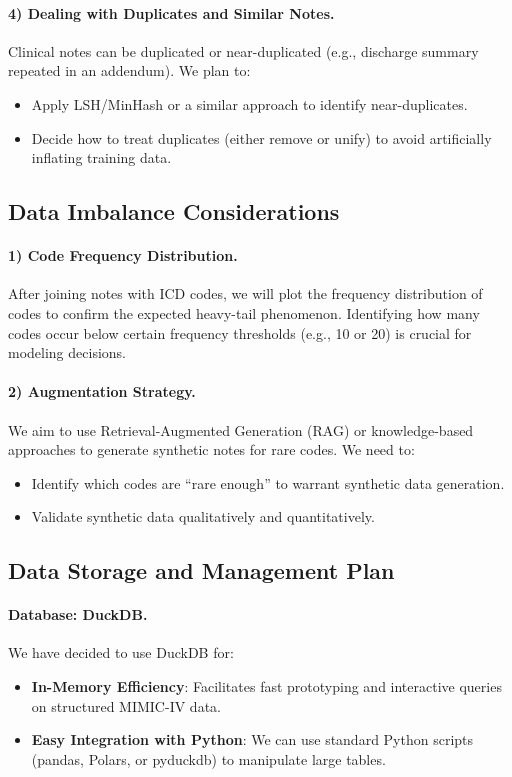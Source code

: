 \documentclass[12pt,a4paper]{report}
\begin{document}
\paragraph{4) Dealing with Duplicates and Similar Notes.}
Clinical notes can be duplicated or near-duplicated (e.g., discharge summary repeated in an addendum). We plan to:
\begin{itemize}
    \item Apply LSH/MinHash or a similar approach to identify near-duplicates.
    \item Decide how to treat duplicates (either remove or unify) to avoid artificially inflating training data.
\end{itemize}

\subsection{Data Imbalance Considerations}

\paragraph{1) Code Frequency Distribution.}
After joining notes with ICD codes, we will plot the frequency distribution of codes to confirm the expected heavy-tail phenomenon. Identifying how many codes occur below certain frequency thresholds (e.g., 10 or 20) is crucial for modeling decisions.

\paragraph{2) Augmentation Strategy.}
We aim to use Retrieval-Augmented Generation (RAG) or knowledge-based approaches to generate synthetic notes for rare codes. We need to:
\begin{itemize}
    \item Identify which codes are “rare enough” to warrant synthetic data generation.
    \item Validate synthetic data qualitatively and quantitatively.
\end{itemize}

\subsection{Data Storage and Management Plan}

\paragraph{Database: DuckDB.}
We have decided to use DuckDB for:
\begin{itemize}
    \item \textbf{In-Memory Efficiency}: Facilitates fast prototyping and interactive queries on structured MIMIC-IV data.
    \item \textbf{Easy Integration with Python}: We can use standard Python scripts (pandas, Polars, or pyduckdb) to manipulate large tables.
\end{itemize}
\end{document}
